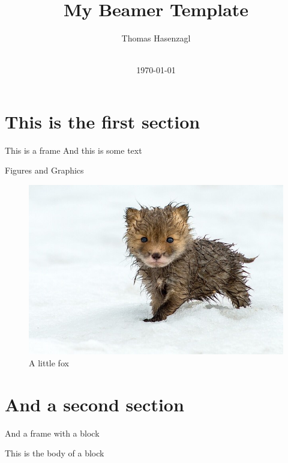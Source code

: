 \documentclass[xcolor=svgnames, 10pt, aspectratio=169]{beamer}
\begin{document}
{ 

\begin{frame}
    \title{\LARGE{My Beamer Template}}
    \author{Thomas Hasenzagl}
\date{
	\\
	\vspace{1cm}
	\today
    }
\titlepage    
\end{frame}}


\section{This is the first section} 


\begin{frame}{This is a frame}
    And this is some text
\end{frame}


\begin{frame}{Figures and Graphics}
    \begin{figure}
        \centering
        \includegraphics[scale=0.3]{fox}
        \caption{A little fox}
    \end{figure}
\end{frame}


\section{And a second section}


\begin{frame}{And a frame with a block}

    \begin{tcolorbox}[title=This is the title of a block]
    This is the body of a block 
    \end{tcolorbox}

\end{frame}
\end{document}
